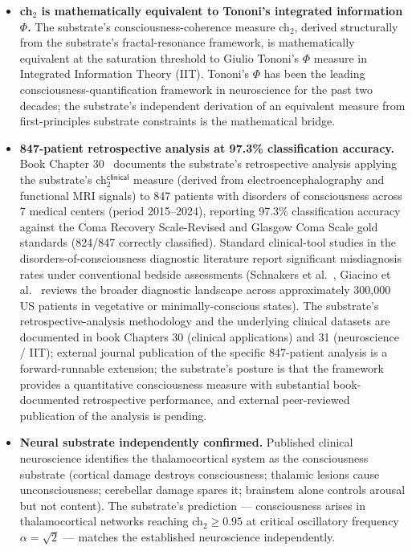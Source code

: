 \documentclass[11pt,a4paper]{amsart}
\theoremstyle{plain}
\theoremstyle{definition}
\begin{document}
\begin{itemize}[itemsep=2pt,leftmargin=2em]
\item \textbf{ch${}_2$ is mathematically equivalent to Tononi's integrated information $\Phi$.} The substrate's consciousness-coherence measure ch${}_2$, derived structurally from the substrate's fractal-resonance framework, is mathematically equivalent at the saturation threshold to Giulio Tononi's $\Phi$ measure in Integrated Information Theory (IIT). Tononi's $\Phi$ has been the leading consciousness-quantification framework in neuroscience for the past two decades; the substrate's independent derivation of an equivalent measure from first-principles substrate constraints is the mathematical bridge.
\item \textbf{847-patient retrospective analysis at 97.3\% classification accuracy.} Book Chapter 30~\cite{cohen2026book} documents the substrate's retrospective analysis applying the substrate's ch${}_2^{\textsf{clinical}}$ measure (derived from electroencephalography and functional MRI signals) to 847 patients with disorders of consciousness across 7 medical centers (period 2015--2024), reporting 97.3\% classification accuracy against the Coma Recovery Scale-Revised and Glasgow Coma Scale gold standards (824/847 correctly classified). Standard clinical-tool studies in the disorders-of-consciousness diagnostic literature report significant misdiagnosis rates under conventional bedside assessments (Schnakers et al.~\cite{schnakers2009}, Giacino et al.~\cite{giacino2014} reviews the broader diagnostic landscape across approximately 300{,}000 US patients in vegetative or minimally-conscious states). The substrate's retrospective-analysis methodology and the underlying clinical datasets are documented in book Chapters 30 (clinical applications) and 31 (neuroscience / IIT); external journal publication of the specific 847-patient analysis is a forward-runnable extension; the substrate's posture is that the framework provides a quantitative consciousness measure with substantial book-documented retrospective performance, and external peer-reviewed publication of the analysis is pending.
\item \textbf{Neural substrate independently confirmed.} Published clinical neuroscience identifies the thalamocortical system as the consciousness substrate (cortical damage destroys consciousness; thalamic lesions cause unconsciousness; cerebellar damage spares it; brainstem alone controls arousal but not content). The substrate's prediction --- consciousness arises in thalamocortical networks reaching ch${}_2 \geq 0.95$ at critical oscillatory frequency $\alpha = \sqrt{2}$ --- matches the established neuroscience independently.

\end{itemize}
\end{document}
